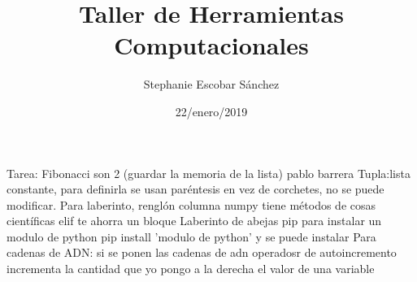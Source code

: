 \documentclass{article}
\title{\Huge Taller de Herramientas Computacionales}
\author{Stephanie Escobar Sánchez}
\date{22/enero/2019}
\begin{document}
	\maketitle
	
Tarea: Fibonacci son 2 (guardar la memoria de la lista)
pablo barrera
Tupla:lista constante, para definirla se usan paréntesis en vez de corchetes, no se puede modificar. 
Para laberinto, renglón columna
numpy tiene métodos de cosas científicas 
elif te ahorra un bloque 
Laberinto de abejas 
pip para instalar un modulo de python pip install 'modulo de python' y se puede instalar
Para cadenas de ADN:
si se ponen las cadenas de adn 
operadosr de autoincremento 
incrementa la cantidad que yo pongo a la derecha el valor de una variable

	
\end{document}
